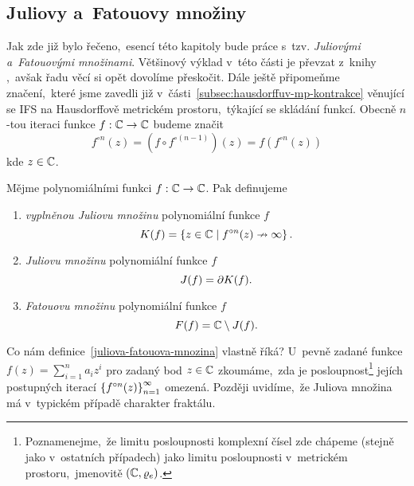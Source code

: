 \subsection{Juliovy a~Fatouovy množiny}\label{subsec:juliovy-fatouovy-mnoziny}

Jak zde již bylo řečeno,~esencí této kapitoly bude práce s~tzv. \emph{Juliovými a~Fatouovými množinami}. Většinový výklad v~této části je převzat z~knihy \cite[str. 235]{Falconer1989},~avšak řadu věcí si opět dovolíme přeskočit. Dále ještě připomeňme značení,~které jsme zavedli již v~části~\ref{subsec:hausdorffuv-mp-kontrakce} věnující se IFS na Hausdorffově metrickém prostoru,~týkající se skládání funkcí. Obecně $n$-tou iteraci funkce $f:\mathbb{C} \rightarrow \mathbb{C}$ budeme značit
\[f^{\circ n}(z)=(f\circ f^{\circ(n-1)})(z)=f(f^{\circ n}(z))\]
kde $z\in\mathbb{C}$.
\begin{definition}\label{juliova-fatouova-mnozina}
    Mějme polynomiálními funkci $f:\mathbb{C} \rightarrow \mathbb{C}$. Pak definujeme
    \begin{enumerate}[label=(\alph*)]
        \item \emph{vyplněnou Juliovu množinu} polynomiální funkce $f$
        \[K(f)=\left\{z\in\mathbb{C}\mid f^{\circ n}(z)\nrightarrow\infty\right\}.\]
        \item \emph{Juliovu množinu} polynomiální funkce $f$
        \[J(f)=\partial K(f).\]
        \item \emph{Fatouovu množinu} polynomiální funkce $f$
        \[F(f)=\mathbb{C}\setminus J(f).\]
    \end{enumerate}
\end{definition}
Co nám definice~\ref{juliova-fatouova-mnozina} vlastně říká? U~pevně zadané funkce $f(z)=\sum_{i=1}^{n}a_iz^i$ pro zadaný bod $z\in\mathbb{C}$ zkoumáme,~zda je posloupnost\footnote{Poznamenejme,~že limitu posloupnosti komplexní čísel zde chápeme (stejně jako v~ostatních případech) jako limitu posloupnosti v~metrickém prostoru,~jmenovitě $(\mathbb{C},\varrho_e)$.} jejích postupných iterací $\left\{f^{\circ n}(z)\right\}_{n=1}^\infty$ omezená. Později uvidíme,~že Juliova množina má v~typickém případě charakter fraktálu.
